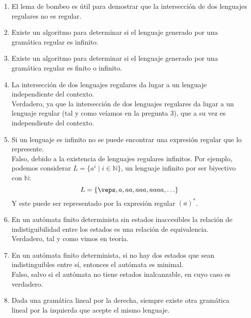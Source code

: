 \begin{enumerate}
    \item El lema de bombeo es útil para demostrar que la intersección de dos lenguajes regulares no es regular.\\

    \item Existe un algoritmo para determinar si el lenguaje generado por una gramática regular es infinito.\\

    \item Existe un algoritmo para determinar si el lenguaje generado por una gramática regular es finito o infinito.\\

    \item La intersección de dos lenguajes regulares da lugar a un lenguaje independiente del contexto.\\

        Verdadero, ya que la intersección de dos lenguajes regulares da lugar a un lenguaje regular (tal y como veíamos en la pregunta 3), que a su vez es independiente del contexto.
    \item Si un lenguaje es infinito no se puede encontrar una expresión regular que lo represente.\\

        Falso, debido a la existencia de lenguajes regulares infinitos. Por ejemplo, podemos considerar $L = \{a^i \mid i \in \mathbb{N}\}$, un lenguaje infinito por ser biyectivo con $\mathbb{N}$:
        \begin{equation*}
            L = \{\veps, a, aa, aaa, aaaa, \ldots\}
        \end{equation*}
        Y este puede ser representado por la expresión regular ${(a)}^{\ast}$.
    \item En un autómata finito determinista sin estados inaccesibles la relación de indistiguibilidad entre los estados es una relación de equivalencia.\\

        Verdadero, tal y como vimos en teoría.
    \item En un autómata finito determinista, si no hay dos estados que sean indistinguibles entre sí, entonces el autómata es minimal.\\

        Falso, salvo si el autómata no tiene estados inalcanzable, en cuyo caso es verdadero.
    \item Dada una gramática lineal por la derecha, siempre existe otra gramática lineal por la izquierda que acepte el mismo lenguaje.\\


\end{enumerate}

